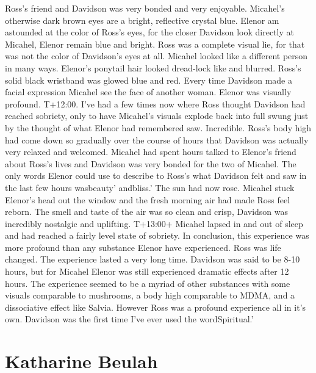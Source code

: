 \documentclass[12pt]{book}
\begin{document}
Ross's friend and Davidson was very bonded and very enjoyable. Micahel's otherwise dark brown eyes are a bright, reflective crystal blue. Elenor am astounded at the color of Ross's eyes, for the closer Davidson look directly at Micahel, Elenor remain blue and bright. Ross was a complete visual lie, for that was not the color of Davidson's eyes at all. Micahel looked like a different person in many ways. Elenor's ponytail hair looked dread-lock like and blurred. Ross's solid black wristband was glowed blue and red. Every time Davidson made a facial expression Micahel see the face of another woman. Elenor was visually profound. T+12:00. I've had a few times now where Ross thought Davidson had reached sobriety, only to have Micahel's visuals explode back into full swung just by the thought of what Elenor had remembered saw. Incredible. Ross's body high had come down so gradually over the course of hours that Davidson was actually very relaxed and welcomed. Micahel had spent hours talked to Elenor's friend about Ross's lives and Davidson was very bonded for the two of Micahel. The only words Elenor could use to describe to Ross's what Davidson felt and saw in the last few hours wasbeauty' andbliss.' The sun had now rose. Micahel stuck Elenor's head out the window and the fresh morning air had made Ross feel reborn. The smell and taste of the air was so clean and crisp, Davidson was incredibly nostalgic and uplifting. T+13:00+ Micahel lapsed in and out of sleep and had reached a fairly level state of sobriety. In conclusion, this experience was more profound than any substance Elenor have experienced. Ross was life changed. The experience lasted a very long time. Davidson was said to be 8-10 hours, but for Micahel Elenor was still experienced dramatic effects after 12 hours. The experience seemed to be a myriad of other substances with some visuals comparable to mushrooms, a body high comparable to MDMA, and a dissociative effect like Salvia. However Ross was a profound experience all in it's own. Davidson was the first time I've ever used the wordSpiritual.'



\chapter{Katharine Beulah}
\end{document}
